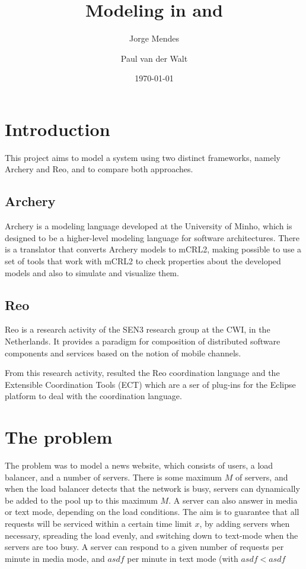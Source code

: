 \documentclass[a4paper]{article}
\author{Jorge Mendes \and Paul van der Walt}
\date{\today}
\title{Modeling in \ar and \re}
\newcommand{\ar}{Archery\xspace}
\newcommand{\re}{Reo\xspace}
\newcommand{\mcrl}{mCRL2\xspace}
\begin{document}
\maketitle

%
%
\section{Introduction}

This project aims to model a system using two distinct frameworks, namely \ar
and \re, and to compare both approaches.

\subsection{\ar}

\ar is a modeling language developed at the University of Minho, which is designed
to be a higher-level modeling language for software architectures. There is a translator
that converts \ar models to \mcrl, making possible to use a set of tools that work with
\mcrl to check properties about the developed models and also to simulate and visualize them.

\subsection{\re}

\re is a research activity of the SEN3 research group at the CWI, in the
Netherlands. It provides a paradigm for composition of distributed software
components and services based on the notion of mobile channels.

From this research activity, resulted the \re coordination language and the
Extensible Coordination Tools (ECT) which are a ser of plug-ins for the Eclipse
platform to deal with the coordination language.

%
%
\section{The problem}

The problem was to model a news website, which consists of users, a load
balancer, and a number of servers. There is some maximum $M$ of servers, and
when the load balancer detects that the network is busy, servers can dynamically
be added to the pool up to this maximum $M$. A server can also answer in media
or text mode, depending on the load conditions. The aim is to guarantee that all
requests will be serviced within a certain time limit $x$, by adding servers
when necessary, spreading the load evenly, and switching down to text-mode when
the servers are too busy. A server can respond to a given number of requests per
minute in media mode, and $asdf$ per minute in text mode (with $asdf<asdf$
\end{document}

